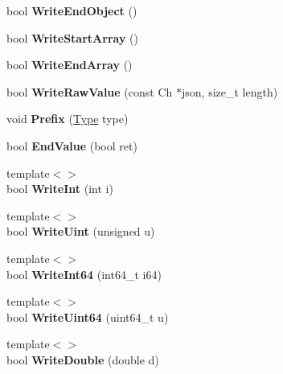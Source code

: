 \begin{DoxyCompactItemize}
\item 
bool {\bfseries Write\+End\+Object} ()\hypertarget{a00335_a7e3f6760a50a72f4217a9b2d625c43ee}{}\label{a00335_a7e3f6760a50a72f4217a9b2d625c43ee}

\item 
bool {\bfseries Write\+Start\+Array} ()\hypertarget{a00335_a3c3560a96cac58f98f4a74d6cb227204}{}\label{a00335_a3c3560a96cac58f98f4a74d6cb227204}

\item 
bool {\bfseries Write\+End\+Array} ()\hypertarget{a00335_aabda2df1be6e83cef416e9b1f042e8f4}{}\label{a00335_aabda2df1be6e83cef416e9b1f042e8f4}

\item 
bool {\bfseries Write\+Raw\+Value} (const Ch $\ast$json, size\+\_\+t length)\hypertarget{a00335_a8ee1135b2595261819b134907f67614e}{}\label{a00335_a8ee1135b2595261819b134907f67614e}

\item 
void {\bfseries Prefix} (\hyperlink{a00677_a1d1cfd8ffb84e947f82999c682b666a7}{Type} type)\hypertarget{a00335_a1fc40f8b9f3abc2548c0c5782ce1755d}{}\label{a00335_a1fc40f8b9f3abc2548c0c5782ce1755d}

\item 
bool {\bfseries End\+Value} (bool ret)\hypertarget{a00335_adc1cadbabc309d31f19cf7463251d879}{}\label{a00335_adc1cadbabc309d31f19cf7463251d879}

\item 
{\footnotesize template$<$$>$ }\\bool {\bfseries Write\+Int} (int i)\hypertarget{a00335_abefb163a93b376d056edecad5a7a82ef}{}\label{a00335_abefb163a93b376d056edecad5a7a82ef}

\item 
{\footnotesize template$<$$>$ }\\bool {\bfseries Write\+Uint} (unsigned u)\hypertarget{a00335_a9665a4a1549b286944b21927b80060cf}{}\label{a00335_a9665a4a1549b286944b21927b80060cf}

\item 
{\footnotesize template$<$$>$ }\\bool {\bfseries Write\+Int64} (int64\+\_\+t i64)\hypertarget{a00335_a3528a42394d50f3b92659de517433c85}{}\label{a00335_a3528a42394d50f3b92659de517433c85}

\item 
{\footnotesize template$<$$>$ }\\bool {\bfseries Write\+Uint64} (uint64\+\_\+t u)\hypertarget{a00335_a025b3d2ca07d539a7067575e95f5578d}{}\label{a00335_a025b3d2ca07d539a7067575e95f5578d}

\item 
{\footnotesize template$<$$>$ }\\bool {\bfseries Write\+Double} (double d)\hypertarget{a00335_af317e1d24249b8c68503a6253c703bd2}{}\label{a00335_af317e1d24249b8c68503a6253c703bd2}

\end{DoxyCompactItemize}
